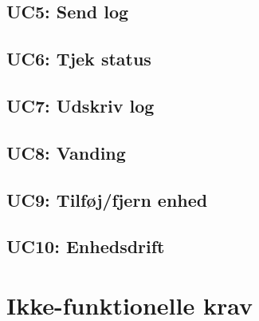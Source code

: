 
\subsection{UC5: Send log}



\subsection{UC6: Tjek status}



\subsection{UC7: Udskriv log}



\subsection{UC8: Vanding}



\subsection{UC9: Tilføj/fjern enhed}



\subsection{UC10: Enhedsdrift}



\section{Ikke-funktionelle krav}
